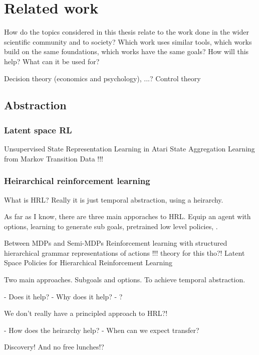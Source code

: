 \chapter{Related work}

How do the topics considered in this thesis relate to the work done in the wider scientific community and to society? Which work uses similar tools, which works build on the same foundations, which works have the same goals? How will this help? What can it be used for?

Decision theory (economics and psychology), ...?
Control theory



\section{Abstraction}

\subsection{Latent space RL}

Unsupervised State Representation Learning in Atari  \cite{Anand2019}
State Aggregation Learning from Markov Transition Data  !!!\cite{Duan2018}


\subsection{Heirarchical reinforcement learning}

What is HRL? Really it is just temporal abstraction, using a heirarchy.

As far as I know, there are three main apporaches to HRL.
Equip an agent with options, learning to generate sub goals, pretrained low level policies, .


Between MDPs and Semi-MDPs \cite{RichardS.SuttonaDoinaPrecupb1998}
Reinforcement learning with structured hierarchical grammar representations of actions  \cite{Christodoulou2019}  !!! theory for this tho?!
Latent Space Policies for Hierarchical Reinforcement Learning \cite{Haarnoja}

Two main approaches. Subgoals and options. To achieve temporal abstraction.

- Does it help?
- Why does it help?
- ?

We don't really have a principled approach to HRL?!

- How does the heirarchy help?
- When can we expect transfer?

Discovery! And no free lunches!?

